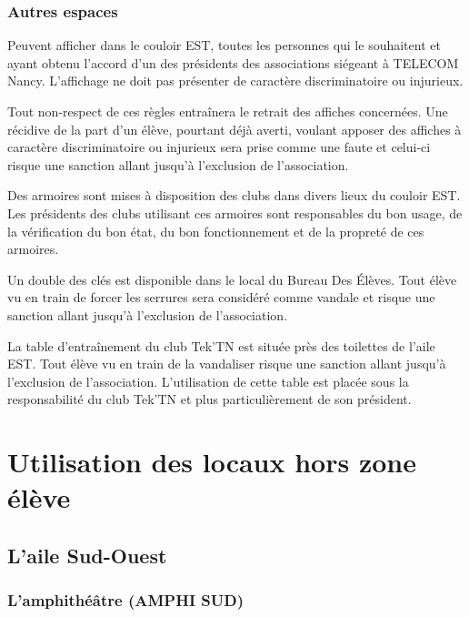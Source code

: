 \documentclass{article} %
\begin{document}
			\subsubsection{Autres espaces}

				Peuvent afficher dans le couloir EST, toutes les personnes qui
				le souhaitent et ayant obtenu l’accord d’un des présidents des
				associations siégeant à TELECOM Nancy. L’affichage ne doit pas
				présenter de caractère discriminatoire ou injurieux.

				Tout non-respect de ces règles entraînera le retrait des
				affiches concernées. Une récidive de la part d’un élève,
				pourtant déjà averti, voulant apposer des affiches à caractère
				discriminatoire ou injurieux sera prise comme une faute et
				celui-ci risque une sanction allant jusqu’à l’exclusion de
				l’association.

				Des armoires sont mises à disposition des clubs dans divers
				lieux du couloir EST\@. Les présidents des clubs utilisant ces
				armoires sont responsables du bon usage, de la vérification du
				bon état, du bon fonctionnement et de la propreté de ces
				armoires. 

				Un double des clés est disponible dans le local du Bureau Des
				Élèves. Tout élève vu en train de forcer les serrures sera
				considéré comme vandale et risque une sanction allant jusqu’à
				l’exclusion de l’association.

				La table d'entraînement du club Tek’TN est située près des
				toilettes de l’aile EST\@. Tout élève vu en train de la
				vandaliser risque une sanction allant jusqu’à l’exclusion de
				l’association. L’utilisation de cette table est placée sous la
				responsabilité du club Tek’TN et plus particulièrement de son
				président.

	\section{Utilisation des locaux hors zone élève}

		\subsection{L’aile Sud-Ouest}

			\subsubsection{L’amphithéâtre (AMPHI SUD)}
\end{document}
